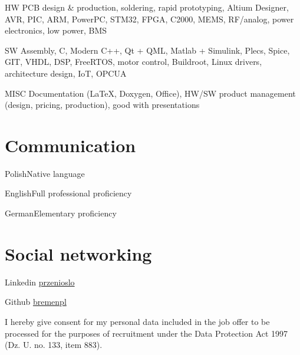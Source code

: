 \documentclass{tccv}
\begin{document}
\begin{factlist}

\item{HW}
     {PCB design \& production, soldering, rapid prototyping, Altium Designer, AVR, PIC, ARM, PowerPC, STM32, FPGA, C2000, MEMS, RF/analog, power electronics, low power, BMS}

\item{SW}
     {Assembly, C, Modern C++, Qt + QML, Matlab + Simulink, Plecs, Spice, GIT, VHDL, DSP, FreeRTOS, motor control, Buildroot, Linux drivers, architecture design, IoT, OPCUA}
     
\item{MISC}
     {Documentation (\LaTeX, Doxygen, Office), HW/SW product management (design, pricing, production), good with presentations}

\end{factlist}

\section{Communication}

\begin{factlist}
\item{Polish}{Native language}
\item{English}{Full professional proficiency}
\item{German}{Elementary proficiency}
\end{factlist}

\section{Social networking}

\begin{factlist}

\item{Linkedin}
     {\href{http://pl.linkedin.com/in/przenioslo}{przenioslo}}
     
\item{Github}
     {\href{http://github.com/bremenpl}{bremenpl}}

\end{factlist} 

\vspace*{\fill} %

{\scriptsize I hereby give consent for my personal data included in the job offer to be processed for the purposes of recruitment under the Data Protection Act 1997 (Dz. U. no. 133, item 883).}
\end{document}
